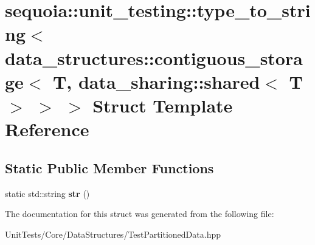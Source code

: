 \hypertarget{structsequoia_1_1unit__testing_1_1type__to__string_3_01data__structures_1_1contiguous__storage_3f56ef0063d651447efc697feec32ba4f}{}\section{sequoia\+::unit\+\_\+testing\+::type\+\_\+to\+\_\+string$<$ data\+\_\+structures\+::contiguous\+\_\+storage$<$ T, data\+\_\+sharing\+::shared$<$ T $>$ $>$ $>$ Struct Template Reference}
\label{structsequoia_1_1unit__testing_1_1type__to__string_3_01data__structures_1_1contiguous__storage_3f56ef0063d651447efc697feec32ba4f}
\subsection*{Static Public Member Functions}
\begin{DoxyCompactItemize}
\item 
\mbox{\label{structsequoia_1_1unit__testing_1_1type__to__string_3_01data__structures_1_1contiguous__storage_3f56ef0063d651447efc697feec32ba4f_aa1ead00ea02e92c600e592f289d3ffa0}} 
static std\+::string {\bfseries str} ()
\end{DoxyCompactItemize}


The documentation for this struct was generated from the following file\+:\begin{DoxyCompactItemize}
\item 
Unit\+Tests/\+Core/\+Data\+Structures/Test\+Partitioned\+Data.\+hpp\end{DoxyCompactItemize}
